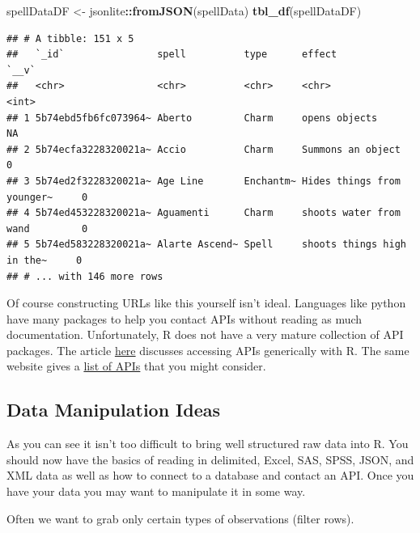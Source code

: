 \documentclass[
]{book}
\newenvironment{Shaded}{\begin{snugshade}}{\end{snugshade}}
\newcommand{\KeywordTok}[1]{\textcolor[rgb]{0.13,0.29,0.53}{\textbf{#1}}}
\newcommand{\NormalTok}[1]{#1}
\newcommand{\OperatorTok}[1]{\textcolor[rgb]{0.81,0.36,0.00}{\textbf{#1}}}
\newcommand{\StringTok}[1]{\textcolor[rgb]{0.31,0.60,0.02}{#1}}
\theoremstyle{definition}
\theoremstyle{definition}
\theoremstyle{definition}
\theoremstyle{remark}
\begin{document}
\begin{Shaded}
\begin{Highlighting}[]
\NormalTok{spellDataDF <-}\StringTok{ }\NormalTok{jsonlite}\OperatorTok{::}\KeywordTok{fromJSON}\NormalTok{(spellData)}
\KeywordTok{tbl_df}\NormalTok{(spellDataDF)}
\end{Highlighting}
\end{Shaded}

\begin{verbatim}
## # A tibble: 151 x 5
##   `_id`                spell          type      effect                     `__v`
##   <chr>                <chr>          <chr>     <chr>                      <int>
## 1 5b74ebd5fb6fc073964~ Aberto         Charm     opens objects                 NA
## 2 5b74ecfa3228320021a~ Accio          Charm     Summons an object              0
## 3 5b74ed2f3228320021a~ Age Line       Enchantm~ Hides things from younger~     0
## 4 5b74ed453228320021a~ Aguamenti      Charm     shoots water from wand         0
## 5 5b74ed583228320021a~ Alarte Ascend~ Spell     shoots things high in the~     0
## # ... with 146 more rows
\end{verbatim}

Of course constructing URLs like this yourself isn't ideal. Languages like python have many packages to help you contact APIs without reading as much documentation. Unfortunately, R does not have a very mature collection of API packages. The article \href{https://www.programmableweb.com/news/how-to-access-any-restful-api-using-r-language/how-to/2017/07/21}{here} discusses accessing APIs generically with R. The same website gives a \href{https://www.programmableweb.com/category/all/apis}{list of APIs} that you might consider.

\hypertarget{data-manipulation-ideas}{%
\subsection{Data Manipulation Ideas}\label{data-manipulation-ideas}}

As you can see it isn't too difficult to bring well structured raw data into R. You should now have the basics of reading in delimited, Excel, SAS, SPSS, JSON, and XML data as well as how to connect to a database and contact an API. Once you have your data you may want to manipulate it in some way.

Often we want to grab only certain types of observations (filter rows).
\end{document}
